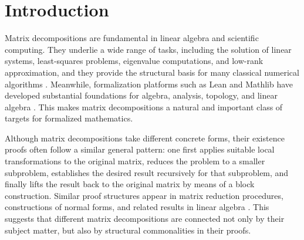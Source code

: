 \documentclass[pdflatex,sn-mathphys-num]{sn-jnl}%
\theoremstyle{thmstyleone}%
\theoremstyle{thmstyletwo}%
\theoremstyle{thmstylethree}%
\begin{document}
\section{Introduction}
\label{sec:introduction}

Matrix decompositions are fundamental in linear algebra and scientific computing. They underlie a wide range of tasks, including the solution of linear systems, least-squares problems, eigenvalue computations, and low-rank approximation, and they provide the structural basis for many classical numerical algorithms \cite{stewart1998matrix,trefethen2022numerical}. Meanwhile, formalization platforms such as Lean and Mathlib have developed substantial foundations for algebra, analysis, topology, and linear algebra \cite{mathlib2020,avigad2020mathematics}. This makes matrix decompositions a natural and important class of targets for formalized mathematics.


Although matrix decompositions take different concrete forms, their existence proofs often follow a similar general pattern: one first applies suitable local transformations to the original matrix, reduces the problem to a smaller subproblem, establishes the desired result recursively for that subproblem, and finally lifts the result back to the original matrix by means of a block construction. Similar proof structures appear in matrix reduction procedures, constructions of normal forms, and related results in linear algebra \cite{aransay2016formalisation,divason2022formalization}. This suggests that different matrix decompositions are connected not only by their subject matter, but also by structural commonalities in their proofs.
\end{document}
